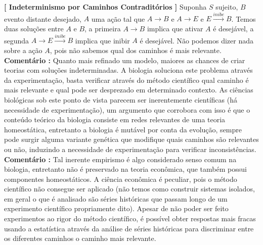 \documentclass[10pt,a4paper]{report}
\begin{document}
\hspace{\baselineskip}

\textbf{[ Indeterminismo por Caminhos Contraditórios ]} Suponha $S$ sujeito, $B$ evento distante desejado, $A$ uma ação tal que $A \rightarrow B$ e $A \rightarrow E$ e $E \overset{inibe}{\rightarrow} B$. Temos duas soluções entre $A$ e $B$, a primeira $A \rightarrow B$ implica que ativar $A$ é desejável, a segunda $A \rightarrow E \overset{inibe}{\rightarrow} B$ implica que inibir $A$ é desejável. Não podemos dizer nada sobre a ação $A$, pois não sabemos qual dos caminhos é mais relevante.\\

\textbf{Comentário :} Quanto mais refinado um modelo, maiores as chances de criar teorias com soluções indeterminadas. A biologia soluciona este problema através da experimentação, basta verificar através do método científico qual caminho é mais relevante e qual pode ser desprezado em determinado contexto. As ciências biológicas sob este ponto de vista parecem ser inerentemente científicas (há necessidade de experimentação), um argumento que corrobora com isso é que o conteúdo teórico da biologia consiste em redes relevantes de uma teoria homeostática, entretanto a biologia é mutável por conta da evolução, sempre pode surgir alguma variante genética que modifique quais caminhos são relevantes ou não, induzindo a necessidade de experimentação para verificar inconsistências.\\

\textbf{Comentário :} Tal inerente empirismo é algo considerado senso comum na biologia, entretanto não é preservado na teoria econômica, que também possui componentes homeostáticos. A ciência econômica é peculiar, pois o método científico não consegue ser aplicado (não temos como construir sistemas isolados, em geral o que é analisado são séries históricas que passam longo de um experimento científico propriamente dito). Apesar de não poder ser feito experimentos ao rigor do método científico, é possível obter respostas mais fracas usando a estatística através da análise de séries históricas para discriminar entre os diferentes caminhos o caminho mais relevante.

\hspace{\baselineskip}
\end{document}
